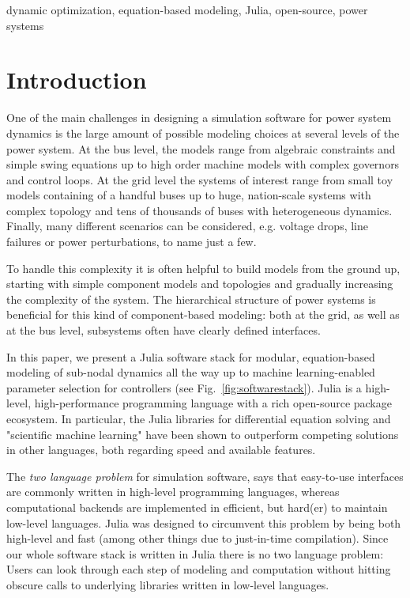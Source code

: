\documentclass[conference]{IEEEtran}
\begin{document}
\begin{IEEEkeywords}
dynamic optimization, equation-based modeling, Julia, open-source, power systems
\end{IEEEkeywords}

\section{Introduction}
One of the main challenges in designing a simulation software for power system dynamics is the large amount of possible modeling choices at several levels of the power system.
At the bus level, the models range from algebraic constraints and simple swing equations up to high order machine models with complex governors and control loops.
At the grid level the systems of interest range from small toy models containing of a handful buses up to huge, nation-scale systems with complex topology and tens of thousands of buses with heterogeneous dynamics.
Finally, many different scenarios can be considered, e.g. voltage drops, line failures or power perturbations, to name just a few.

To handle this complexity it is often helpful to build models from the ground up, starting with simple component models and topologies and gradually increasing the complexity of the system. 
The hierarchical structure of power systems is beneficial for this kind of component-based modeling: both at the grid, as well as at the bus level, subsystems often have clearly defined interfaces.

In this paper, we present a Julia software stack for modular, equation-based modeling of sub-nodal dynamics all the way up to machine learning-enabled parameter selection for controllers (see Fig.~\ref{fig:softwarestack}). Julia\cite{Julia-2017} is a high-level, high-performance programming language with a rich open-source package ecosystem. In particular, the Julia libraries for differential equation solving\cite{rackauckas2017differentialequations, diffeq_uebersicht} and "scientific machine learning"\cite{SciML, SciML_vergleich} have been shown to outperform competing solutions in other languages, both regarding speed and available features.

The \emph{two language problem} for simulation software, says that easy-to-use interfaces  are commonly written in high-level programming languages, whereas computational backends are implemented in efficient, but hard(er) to maintain low-level languages. Julia was designed to circumvent this problem by being both high-level and fast\cite{Julia-2017} (among other things due to just-in-time compilation).
Since our whole software stack is written in Julia there is no two language problem: Users can look through each step of modeling and computation without hitting obscure calls to underlying libraries written in low-level languages. 
\end{document}
